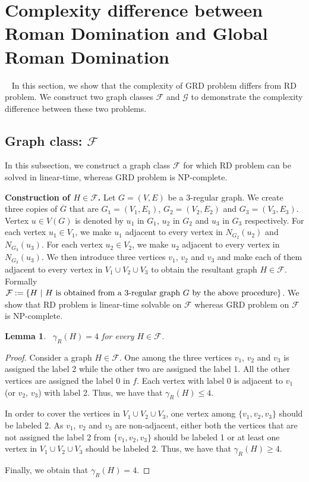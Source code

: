 \documentclass[preprint,12pt]{elsarticle}
\newcommand{\grd}{{\sc Global Roman Domination}}
\newcommand{\rd}{{\sc Roman Domination}}
\newtheorem{lemma}{Lemma}
\begin{document}
\section{Complexity difference between \rd{} and \grd{}}~\label{sec4}
In this section, we show that the complexity of GRD problem differs from RD problem. We construct two graph classes $\mathcal{F}$ and $\mathcal{G}$ to demonstrate the complexity difference between these two problems. 
\subsection{Graph class: $\mathcal{F}$} In this subsection, we construct a graph class $\mathcal{F}$ for which RD problem can be solved in linear-time, whereas GRD problem is NP-complete. 

\medskip
\noindent \textbf{Construction of $H \in \mathcal{F}$.} Let $G = (V, E)$ be a 3-regular graph. We create three copies of $\overline{G}$ that are $G_1 = (V_1, E_1)$, $G_2 = (V_2, E_2)$ and $G_3 = (V_3, E_3)$. Vertex $u \in V(G)$ is denoted by $u_1$ in $G_1$, $u_2$ in $G_2$ and $u_3$ in $G_3$ respectively. For each vertex $u_1 \in V_1$, we make $u_1$ adjacent to every vertex in $N_{G_2}(u_2)$ and $N_{G_3}(u_3)$. For each vertex $u_2 \in V_2$, we make $u_2$ adjacent to every vertex in $N_{G_3}(u_3)$. We then introduce three vertices $v_1$, $v_2$ and $v_3$ and make each of them adjacent to every vertex in $V_1 \cup V_2 \cup V_3$ to obtain the resultant graph $H \in \mathcal{F}$. Formally $\mathcal{F}:=\{H~|~ \text{$H$ is obtained from a 3-regular graph $G$ by the above } \\ \text{procedure}\}$.
We show that RD problem is linear-time solvable on $\mathcal{F}$ whereas GRD problem on $\mathcal{F}$ is NP-complete.
\begin{lemma}~\label{f1}
    $\gamma_{R}(H) = 4$ for every $H \in \mathcal{F}$.
\end{lemma}
\begin{proof}
    Consider a graph $H \in \mathcal{F}$. One among the three vertices $v_1$, $v_2$ and $v_3$ is assigned the label 2 while the other two are assigned the label 1. All the other vertices are assigned the label 0 in $f$. Each vertex with label 0 is adjacent to $v_1$ (or $v_2$, $v_3$) with label 2. Thus, we have that $\gamma_{R}(H) \leq 4$. 
    
    In order to cover the vertices in $V_1 \cup V_2 \cup V_3$, one vertex among $\{v_1, v_2, v_3\}$ should be labeled 2. As $v_1$, $v_2$ and $v_3$ are non-adjacent, either both the vertices that are not assigned the label 2 from $\{v_1,v_2, v_3\}$ should be labeled 1 or at least one vertex in $V_1 \cup V_2 \cup V_3$ should be labeled 2. Thus, we have that $\gamma_{R}(H) \geq 4$. 
    
    Finally, we obtain that $\gamma_{R}(H) = 4$. 
\end{proof}
\end{document}
